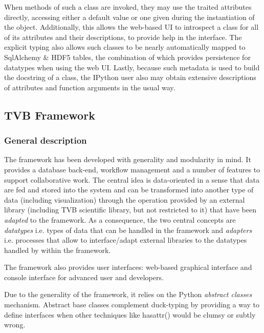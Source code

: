 
 When methods of such a class are invoked,
they may use the traited attributes directly, accessing either a default value
or one given during the instantiation of the object. Additionally, this allows
the web-based UI to introspect a class for all of its attributes and their
descriptions, to provide help in the interface. The explicit typing also allows
such classes to be nearly automatically mapped to SqlAlchemy \& HDF5 tables,
the combination of which provides persistence for datatypes when using the web
UI.  Lastly, because such metadata is used to build the docstring of a class,
the IPython user also may obtain extensive descriptions of attributes and
function arguments in the usual way. 



\subsection{TVB Framework}

	\subsubsection{General description}

The framework has been developed with generality and modularity in mind. It
provides a database back-end, workflow management and a number of features to
support collaborative work.  The central idea is data-oriented in a sense that
data are fed and stored into the system and can be transformed into another type
of data (including visualization) through the operation provided by an external
library (including TVB scientific library, but not restricted to it) that have
been \emph{adapted} to the framework. As a consequence, the two central concepts
are \emph{datatypes} i.e. types of data that can be handled in the framework and
\emph{adapters} i.e. processes that allow to interface/adapt external libraries
to  the datatypes handled by within the framework.

The framework also provides user interfaces: web-based graphical interface and
console interface for advanced user and developers.

Due to the generality of the framework, it relies on
the Python \emph{abstract classes} mechanism.
Abstract base classes complement duck-typing by providing a way to define
interfaces when other techniques like hasattr() would be clumsy or subtly wrong.

